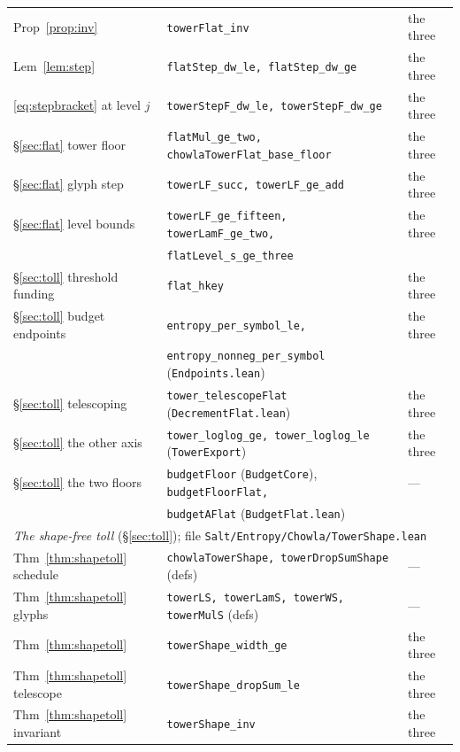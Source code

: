 \documentclass[11pt]{amsart}
\newcommand{\leaninline}[1]{{\small\texttt{#1}}}
\theoremstyle{remark}
\begin{document}
\begin{table}[h]
\begin{tabular}{lll}
Prop~\ref{prop:inv} & \leaninline{towerFlat\_inv} & the three \\
Lem~\ref{lem:step} & \leaninline{flatStep\_dw\_le, flatStep\_dw\_ge} & the three \\
\eqref{eq:stepbracket} at level $j$ & \leaninline{towerStepF\_dw\_le, towerStepF\_dw\_ge} & the three \\
\S\ref{sec:flat} tower floor & \leaninline{flatMul\_ge\_two,
  chowlaTowerFlat\_base\_floor} & the three \\
\S\ref{sec:flat} glyph step & \leaninline{towerLF\_succ, towerLF\_ge\_add} & the three \\
\S\ref{sec:flat} level bounds & \leaninline{towerLF\_ge\_fifteen,
  towerLamF\_ge\_two,} & the three \\
 & \leaninline{flatLevel\_s\_ge\_three} & \\
\S\ref{sec:toll} threshold funding & \leaninline{flat\_hkey} & the three \\
\S\ref{sec:toll} budget endpoints & \leaninline{entropy\_per\_symbol\_le,}
  & the three \\
 & \leaninline{entropy\_nonneg\_per\_symbol} (\texttt{Endpoints.lean}) & \\
\S\ref{sec:toll} telescoping & \leaninline{tower\_telescopeFlat}
  (\texttt{DecrementFlat.lean}) & the three \\
\S\ref{sec:toll} the other axis & \leaninline{tower\_loglog\_ge,
  tower\_loglog\_le} (\texttt{TowerExport}) & the three \\
\S\ref{sec:toll} the two floors & \leaninline{budgetFloor}
  (\texttt{BudgetCore}), \leaninline{budgetFloorFlat,} & --- \\
 & \leaninline{budgetAFlat} (\texttt{BudgetFlat.lean}) & \\
\midrule
\multicolumn{3}{l}{\emph{The shape-free toll} (\S\ref{sec:toll});
file \texttt{Salt/Entropy/Chowla/TowerShape.lean}} \\
\midrule
Thm~\ref{thm:shapetoll} schedule & \leaninline{chowlaTowerShape,
  towerDropSumShape} (defs) & --- \\
Thm~\ref{thm:shapetoll} glyphs & \leaninline{towerLS, towerLamS, towerWS,
  towerMulS} (defs) & --- \\
Thm~\ref{thm:shapetoll} & \leaninline{towerShape\_width\_ge} & the three \\
Thm~\ref{thm:shapetoll} telescope & \leaninline{towerShape\_dropSum\_le} & the three \\
Thm~\ref{thm:shapetoll} invariant & \leaninline{towerShape\_inv} & the three \\

\end{tabular}
\end{table}
\end{document}
